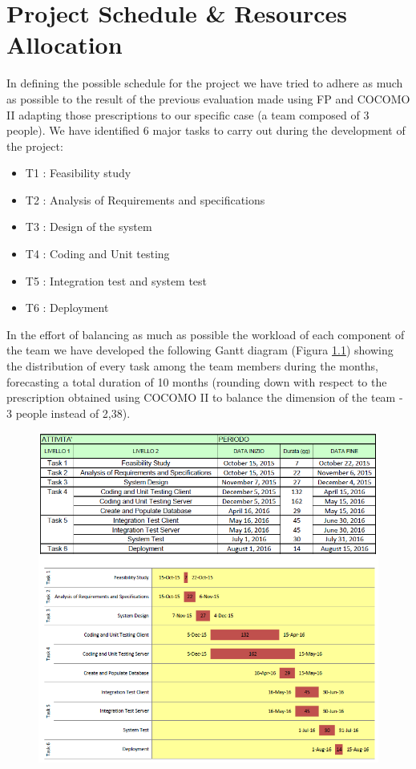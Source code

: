 \chapter{Project Schedule \& Resources Allocation} \label{chap4}
In defining the possible schedule for the project we have tried to adhere as much as possible to the result of the previous evaluation made using FP and COCOMO II adapting those prescriptions to our specific case (a team composed of 3 people).
We have identified 6 major tasks to carry out during the development of the project:
\begin{itemize}
	\item T1 : Feasibility study
	\item T2 : Analysis of Requirements and specifications
	\item T3 : Design of the system
	\item T4 : Coding and Unit testing
	\item T5 : Integration test and system test
	\item T6 : Deployment
\end{itemize}
In the effort of balancing as much as possible the workload of each component of the team we have developed the following Gantt diagram (Figura \ref{fig:scheduele}) showing the distribution of every task among the team members during the months, forecasting a total duration of 10 months (rounding down with respect to the prescription obtained using COCOMO II to balance the dimension of the team - 3 people instead of 2,38).

\begin{figure}[!htbp]
\centering
\includegraphics[width=\textwidth]{cpt/img/Schedule}
\label{fig:scheduele}
\end{figure}